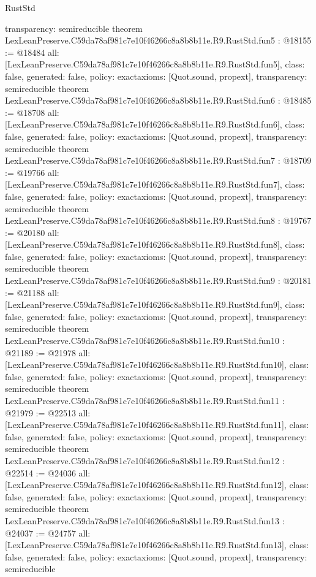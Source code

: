 \begin{lexlean}{RustStd}
\begin{coremodule}
{  transparency: semireducible
}
theorem LexLeanPreserve.C59da78af981c7e10f46266c8a8b8b11e.R9.RustStd.fun5 : @18155 := @18484 {
  all: [LexLeanPreserve.C59da78af981c7e10f46266c8a8b8b11e.R9.RustStd.fun5],
  class: false,
  generated: false,
  policy: exact{axioms: [Quot.sound, propext]},
  transparency: semireducible
}
theorem LexLeanPreserve.C59da78af981c7e10f46266c8a8b8b11e.R9.RustStd.fun6 : @18485 := @18708 {
  all: [LexLeanPreserve.C59da78af981c7e10f46266c8a8b8b11e.R9.RustStd.fun6],
  class: false,
  generated: false,
  policy: exact{axioms: [Quot.sound, propext]},
  transparency: semireducible
}
theorem LexLeanPreserve.C59da78af981c7e10f46266c8a8b8b11e.R9.RustStd.fun7 : @18709 := @19766 {
  all: [LexLeanPreserve.C59da78af981c7e10f46266c8a8b8b11e.R9.RustStd.fun7],
  class: false,
  generated: false,
  policy: exact{axioms: [Quot.sound, propext]},
  transparency: semireducible
}
theorem LexLeanPreserve.C59da78af981c7e10f46266c8a8b8b11e.R9.RustStd.fun8 : @19767 := @20180 {
  all: [LexLeanPreserve.C59da78af981c7e10f46266c8a8b8b11e.R9.RustStd.fun8],
  class: false,
  generated: false,
  policy: exact{axioms: [Quot.sound, propext]},
  transparency: semireducible
}
theorem LexLeanPreserve.C59da78af981c7e10f46266c8a8b8b11e.R9.RustStd.fun9 : @20181 := @21188 {
  all: [LexLeanPreserve.C59da78af981c7e10f46266c8a8b8b11e.R9.RustStd.fun9],
  class: false,
  generated: false,
  policy: exact{axioms: [Quot.sound, propext]},
  transparency: semireducible
}
theorem LexLeanPreserve.C59da78af981c7e10f46266c8a8b8b11e.R9.RustStd.fun10 : @21189 := @21978 {
  all: [LexLeanPreserve.C59da78af981c7e10f46266c8a8b8b11e.R9.RustStd.fun10],
  class: false,
  generated: false,
  policy: exact{axioms: [Quot.sound, propext]},
  transparency: semireducible
}
theorem LexLeanPreserve.C59da78af981c7e10f46266c8a8b8b11e.R9.RustStd.fun11 : @21979 := @22513 {
  all: [LexLeanPreserve.C59da78af981c7e10f46266c8a8b8b11e.R9.RustStd.fun11],
  class: false,
  generated: false,
  policy: exact{axioms: [Quot.sound, propext]},
  transparency: semireducible
}
theorem LexLeanPreserve.C59da78af981c7e10f46266c8a8b8b11e.R9.RustStd.fun12 : @22514 := @24036 {
  all: [LexLeanPreserve.C59da78af981c7e10f46266c8a8b8b11e.R9.RustStd.fun12],
  class: false,
  generated: false,
  policy: exact{axioms: [Quot.sound, propext]},
  transparency: semireducible
}
theorem LexLeanPreserve.C59da78af981c7e10f46266c8a8b8b11e.R9.RustStd.fun13 : @24037 := @24757 {
  all: [LexLeanPreserve.C59da78af981c7e10f46266c8a8b8b11e.R9.RustStd.fun13],
  class: false,
  generated: false,
  policy: exact{axioms: [Quot.sound, propext]},
  transparency: semireducible
}
\end{coremodule}
\end{lexlean}
